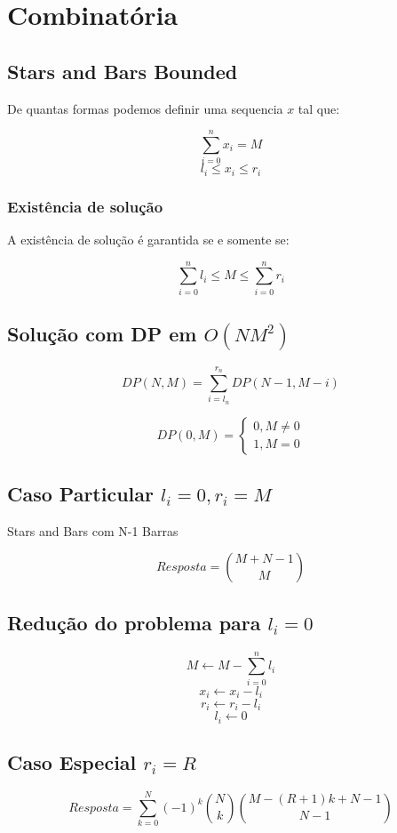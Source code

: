 \section{Combinatória}

\subsection{Stars and Bars Bounded}

De quantas formas podemos definir uma sequencia $x$ tal que:

$$ \sum^{n}_{i=0} x_i = M $$
$$ l_i \leq x_i \leq r_i $$

\subsubsection{Existência de solução}

A existência  de solução é garantida se e somente se:

$$ \sum^{n}_{i=0} l_i \leq M \leq \sum^{n}_{i=0} r_i $$

\subsection{Solução com DP em $ O(NM^2) $}

$$ DP(N, M) = \sum^{r_n}_{i=l_n} DP(N-1, M-i) $$

$$
DP(0, M) =
    \begin{cases}
        0, M \neq 0 \\
        1, M = 0
    \end{cases}
$$

\subsection{Caso Particular $ l_i = 0 , r_i = M$}

Stars and Bars com N-1 Barras

$$ Resposta = \binom{M+N-1}{M} $$

\subsection{Redução do problema para $l_i = 0$}

$$ M \xleftarrow{} M - \sum^{n}_{i=0} l_i $$
$$ x_i \xleftarrow{} x_i - l_i $$
$$ r_i \xleftarrow{} r_i - l_i $$
$$ l_i \xleftarrow{} 0 $$

\subsection{Caso Especial $ r_i = R $}

$$ Resposta = \sum^{N}_{k=0} (-1)^k \binom{N}{k} \binom{M - (R + 1) k + N - 1}{N-1} $$

